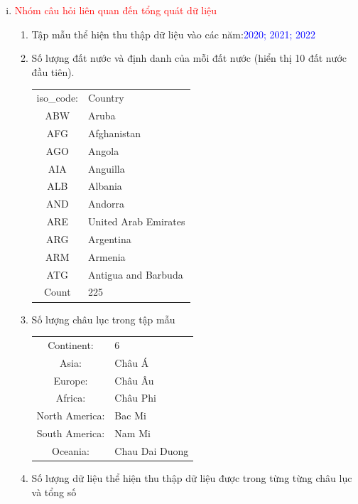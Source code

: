 \documentclass[a4paper]{article}
\theoremstyle{definition}
\begin{document}
\begin{enumerate}[i)]
\item \textcolor{red}{Nhóm câu hỏi liên quan đến tổng quát dữ liệu}
\begin{enumerate}[1)]
    \item Tập mẫu thể hiện thu thập dữ liệu vào các năm:\textcolor{blue} {2020; 2021; 2022}
    \item Số lượng đất nước và định danh của mỗi đất nước (hiển thị 10 đất nước đầu tiên).
    \begin{center}
      \begin{tabular}{ c  l  }
    iso\_code: & Country              \\  
    ABW      &    Aruba               \\            
    AFG      &   Afghanistan          \\        
    AGO      &    Angola              \\        
    AIA      &    Anguilla            \\       
    ALB      &    Albania             \\         
    AND      &    Andorra             \\        
    ARE      &    United Arab Emirates\\
    ARG      &    Argentina           \\
    ARM      &    Armenia             \\
    ATG      &    Antigua and Barbuda \\  
    Count    &    225                 
       \end{tabular}
    \end{center}
    \item Số lượng châu lục trong tập mẫu
    \begin{center}
      \begin{tabular}{ c l }
        Continent:  &            6      \\
          Asia:      &   Châu Á         \\
        Europe:     &  Châu Âu          \\
        Africa:      & Châu Phi         \\
 North America:      &   Bac Mi         \\
 South America:      &   Nam Mi         \\
       Oceania:      & Chau Dai Duong   
       \end{tabular}
    \end{center}
    \item Số lượng dữ liệu thể hiện thu thập dữ liệu được trong từng từng châu lục và tổng số

\end{enumerate}
\end{enumerate}
\end{document}
